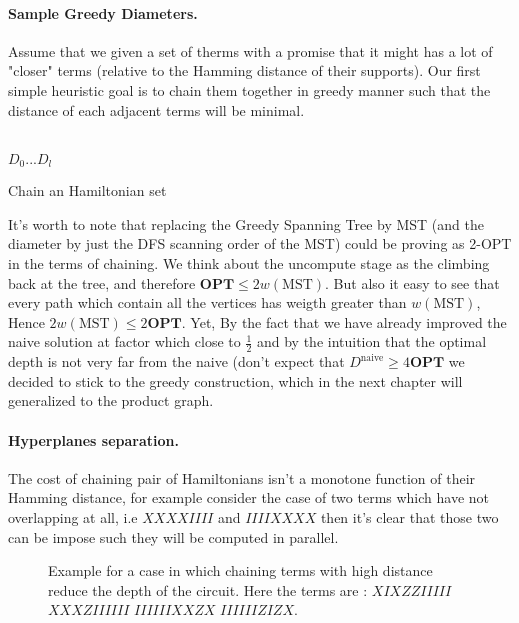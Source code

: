 \documentclass{article}
\begin{document}
\begin{multicols*}{2}
\paragraph{Sample Greedy Diameters.} Assume that we given a set of therms with a promise that it might has a lot of "closer" terms (relative to the Hamming distance of their supports). Our first simple heuristic goal is to chain them together in greedy manner such that the distance of each adjacent terms will be minimal. 


\begin{algorithm}[H]
\SetAlgoLined
\ \\ 
\Return \(D_{0} ... D_{l}\) 
 \caption{Chain an Hamiltonian set }
\end{algorithm}
It's worth to note that replacing the Greedy Spanning Tree by MST (and the diameter by just the DFS scanning order of the MST) could be proving as 2-OPT in the terms of chaining. We think about the uncompute stage as the climbing back at the tree, and therefore \( \textbf{OPT} \le 2w\left(\text{MST} \right) \). But also it easy to see that every path which contain all the vertices has weigth greater than \(w\left(\text{MST} \right) \), Hence  \(2w\left(\text{MST} \right) \le 2\textbf{OPT}\).          
Yet, By the fact that we have already improved the naive solution at factor which close to \(\frac{1}{2}\) and by the intuition that the optimal depth is not very far from the naive (don't expect that \( D^{\text{naive}} \ge 4 \textbf{OPT} \) we decided to stick to the greedy construction, which in the next chapter will generalized to the product graph. 

\paragraph{Hyperplanes separation.} The cost of chaining pair of Hamiltonians isn't  a monotone function of their Hamming distance, for example consider the case of two terms which have not overlapping at all, i.e \( XXXXIIII \) and \(IIIIXXXX \) then it's clear that those two can be impose such they will be computed in parallel.   


\begin{figure}[H]
  \centering
    
    \caption{ Example for a case in which chaining terms with high distance reduce the depth of the circuit. Here the terms are : \(XIXZZIIIII \) \( XXXZIIIIII \) \( IIIIIIXXZX\) \( IIIIIIZIZX \). }
    \label{fig:average-data-vs-model}
\end{figure}


\end{multicols*}
\end{document}
